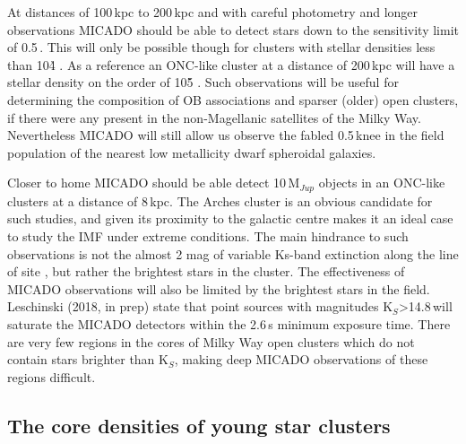 At distances of 100\,kpc to 200\,kpc and with careful photometry and longer
observations MICADO should be able to detect stars down to the sensitivity
limit of 0.5\,\msun. This will only be possible though for clusters with
stellar densities less than 10\h4 \spa. As a reference an ONC-like cluster at a
distance of 200\,kpc will have a stellar density on the order of 10\h5 \spa.
Such observations will be useful for determining the composition of OB
associations and sparser (older) open clusters, if there were any present in
the non-Magellanic satellites of the Milky Way. Nevertheless MICADO will still
allow us observe the fabled 0.5\,\msun knee in the field population of the
nearest low metallicity dwarf spheroidal galaxies.

Closer to home MICADO should be able detect 10\,M$_{Jup}$ objects in an
ONC-like clusters at a distance of 8\,kpc. The Arches cluster is an obvious
candidate for such studies, and given its proximity to the galactic centre
makes it an ideal case to study the IMF under extreme conditions. The main
hindrance to such observations is not the almost 2 mag of variable Ks-band
extinction  along the line of site \citep{espinoza2009}, but rather the
brightest stars in the cluster. The effectiveness of MICADO observations will
also be limited by the brightest stars in the field. Leschinski (2018, in prep)
state that point sources with magnitudes K$_S$\textgreater14.8\,\m will
saturate the MICADO detectors within the 2.6\,s minimum exposure time. There
are very few regions in the cores of Milky Way open clusters which do not
contain stars brighter than K$_S$\m, making deep MICADO observations of
these regions difficult.


\subsection{The core densities of young star clusters}

